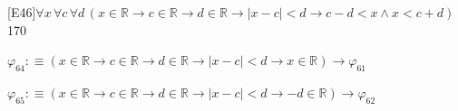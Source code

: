 \begin{fullproof}{[E46]}{$\forall x\,\forall c\,\forall d\,(x \in \mathbb{R} \to c \in \mathbb{R} \to d \in \mathbb{R} \to \lvert x - c \rvert < d \to c - d < x \land x < c + d)$}{170}
\begin{abbrevlist}
\item $\varphi_{64} :\equiv (x \in \mathbb{R} \to c \in \mathbb{R} \to d \in \mathbb{R} \to \lvert x - c \rvert < d \to x \in \mathbb{R}) \to \varphi_{61}$
\item $\varphi_{65} :\equiv (x \in \mathbb{R} \to c \in \mathbb{R} \to d \in \mathbb{R} \to \lvert x - c \rvert < d \to -d \in \mathbb{R}) \to \varphi_{62}$
\end{abbrevlist}
\end{fullproof}
